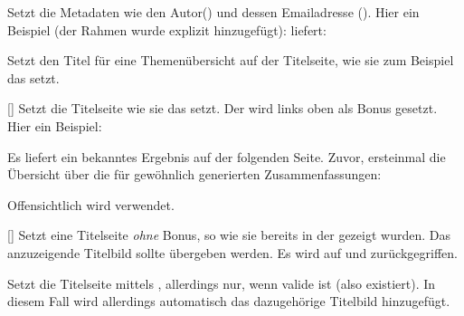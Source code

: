 %
%

Setzt die Metadaten wie den Autor() und dessen Emailadresse (). Hier ein Beispiel (der Rahmen wurde explizit hinzugefügt):  liefert:\smallskip\\
\framebox{\LILLYxPHILOSOPHERxMETADATA}

%
%
%

Setzt den Titel für eine Themenübersicht auf der Titelseite, wie sie zum Beispiel das  setzt.

%
%
%

[\secline{}\secline{}\secline{}]
Setzt die Titelseite wie sie das  setzt. Der  wird links oben als Bonus gesetzt. Hier ein Beispiel:
Es liefert ein bekanntes Ergebnis auf der folgenden Seite. Zuvor, ersteinmal die Übersicht über die für gewöhnlich generierten Zusammenfassungen:
\begin{tcbraster}[raster columns=4, blankest,graphics pages={9,...,16},colback=white]
\end{tcbraster}
{
\def\LILLYxFACULTY{\LILLYxFACULTYxMATHE}
\def\LILLYxFACULTYxCOLOR{FacultyMathexColor}
\def\LILLYxVorlesung{ANA1}
}
Offensichtlich wird  verwendet.

%
%
%

[]
Setzt eine Titelseite \emph{ohne} Bonus, so wie sie bereits in der  gezeigt wurden. Das anzuzeigende Titelbild sollte übergeben werden. Es wird auf  und  zurückgegriffen.

%
%
%

Setzt die Titelseite mittels , allerdings nur, wenn  valide ist (also existiert). In diesem Fall wird allerdings automatisch das dazugehörige Titelbild hinzugefügt.



